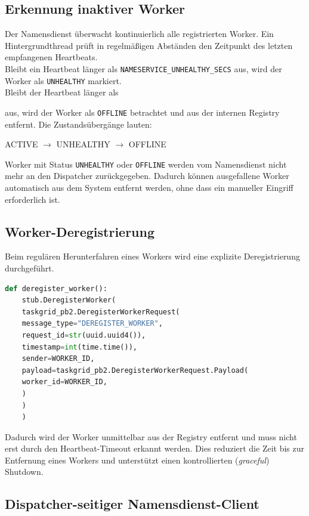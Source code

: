 \subsection{Erkennung inaktiver Worker}

Der Namensdienst überwacht kontinuierlich alle registrierten Worker.
Ein Hintergrundthread prüft in regelmäßigen Abständen den Zeitpunkt des letzten empfangenen Heartbeats.
\\
Bleibt ein Heartbeat länger als \texttt{NAMESERVICE\_UNHEALTHY\_SECS} aus, wird der Worker als \texttt{UNHEALTHY} markiert.
\\
Bleibt der Heartbeat länger als


\noindent aus, wird der Worker als \texttt{OFFLINE} betrachtet und aus der internen Registry entfernt.
Die Zustandsübergänge lauten:

\begin{center}
	ACTIVE $\rightarrow$ UNHEALTHY $\rightarrow$ OFFLINE
\end{center}
Worker mit Status \texttt{UNHEALTHY} oder \texttt{OFFLINE} werden vom Namensdienst nicht mehr an den Dispatcher zurückgegeben.
Dadurch können ausgefallene Worker automatisch aus dem System entfernt werden, ohne dass ein manueller Eingriff erforderlich ist.

\subsection{Worker-Deregistrierung}

Beim regulären Herunterfahren eines Workers wird eine explizite Deregistrierung durchgeführt.

\begin{lstlisting}[language=Python,caption={Graceful Shutdown (worker.py)}]
	def deregister_worker():
	stub.DeregisterWorker(
	taskgrid_pb2.DeregisterWorkerRequest(
	message_type="DEREGISTER_WORKER",
	request_id=str(uuid.uuid4()),
	timestamp=int(time.time()),
	sender=WORKER_ID,
	payload=taskgrid_pb2.DeregisterWorkerRequest.Payload(
	worker_id=WORKER_ID,
	)
	)
	)
\end{lstlisting}
Dadurch wird der Worker unmittelbar aus der Registry entfernt und muss nicht erst durch den Heartbeat-Timeout erkannt werden.
Dies reduziert die Zeit bis zur Entfernung eines Workers und unterstützt einen kontrollierten (\emph{graceful}) Shutdown.

\subsection{Dispatcher-seitiger Namensdienst-Client}

